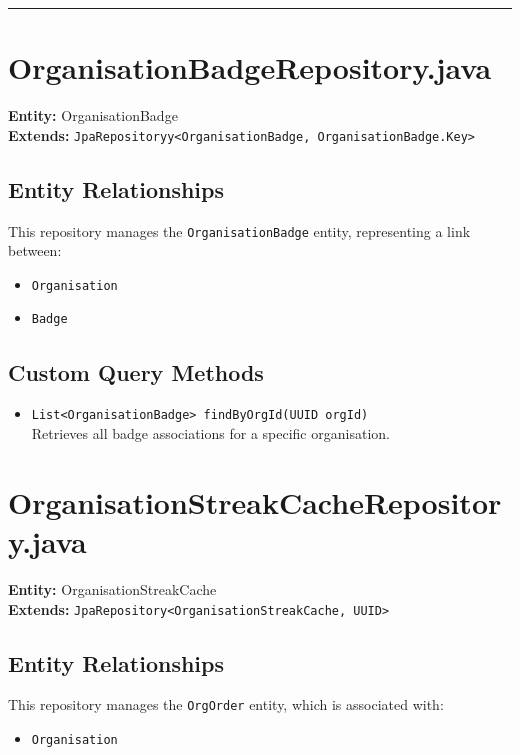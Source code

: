 \documentclass[12pt]{article}
\begin{document}
\hrule
\vspace{1em}

\section{OrganisationBadgeRepository.java}

\textbf{Entity:} OrganisationBadge \\
\textbf{Extends:} \texttt{JpaRepositoryy<OrganisationBadge, OrganisationBadge.Key>}

\subsection*{Entity Relationships}
This repository manages the \texttt{OrganisationBadge} entity, representing a link between:
\begin{itemize}
    \item \texttt{Organisation}
    \item \texttt{Badge}
\end{itemize}

\subsection*{Custom Query Methods}
\begin{itemize}
    \item \texttt{List<OrganisationBadge> findByOrgId(UUID orgId)} \\
  Retrieves all badge associations for a specific organisation.
\end{itemize}



\section{OrganisationStreakCacheRepository.java}

\textbf{Entity:} OrganisationStreakCache \\
\textbf{Extends:} \texttt{JpaRepository<OrganisationStreakCache, UUID>}

\subsection*{Entity Relationships}
This repository manages the \texttt{OrgOrder} entity, which is associated with:
\begin{itemize}
    \item \texttt{Organisation}
\end{itemize}
\end{document}

